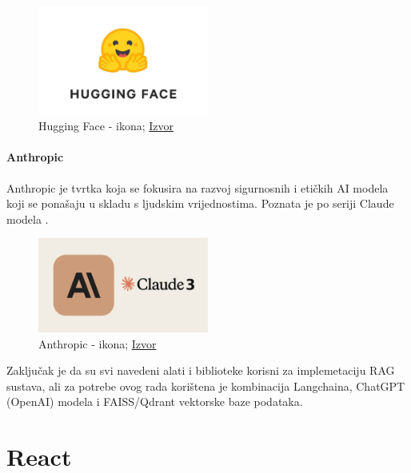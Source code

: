 \documentclass[]{foi}
\begin{document}
\begin{figure}[h]
  \centering
  \includegraphics[width=0.5\textwidth]{./assets/hugging_face_icon.png}
  \caption{Hugging Face - ikona; \href{https://miro.medium.com/v2/resize:fit:463/1*y_0d92c-kSZGrSErMeYWbQ.png}{Izvor}}
  \label{fig:slika12}
\end{figure}

\subsubsection{Anthropic}
Anthropic je tvrtka koja se fokusira na razvoj sigurnosnih i etičkih AI modela koji se ponašaju u skladu s ljudskim vrijednostima. Poznata je po seriji Claude modela \cite{ozkaya2025llm}. 

\begin{figure}[h]
  \centering
  \includegraphics[width=0.5\textwidth]{./assets/anthropic.png}
  \caption{Anthropic - ikona; \href{https://miro.medium.com/v2/resize:fit:1024/0*bg0UgmZY3YP0p0FB.png}{Izvor}}
  \label{fig:slika11}
\end{figure}

Zaključak je da su svi navedeni alati i biblioteke korisni za implemetaciju RAG sustava, ali za potrebe ovog rada korištena je  kombinacija
Langchaina, ChatGPT (OpenAI) modela i FAISS/Qdrant vektorske baze podataka. 



\chapter{React}
\end{document}
